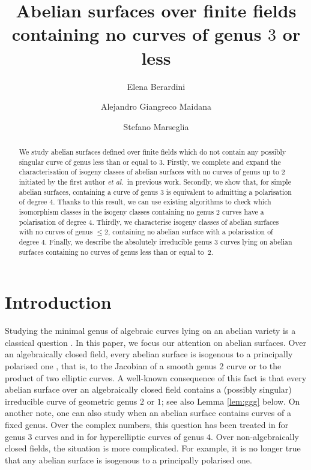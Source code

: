 \documentclass[11pt]{amsart}
\title{Abelian surfaces over finite fields containing no curves of genus $3$ or less}
\author{Elena Berardini}
\author{Alejandro Giangreco Maidana}
\author{Stefano Marseglia}
\theoremstyle{plain}
\theoremstyle{definition}
\begin{document}
\begin{abstract}
    We study abelian surfaces defined over finite fields which do not contain any possibly singular curve of genus less than or equal to $3$. 
    Firstly, we complete and expand the characterisation of isogeny classes of abelian surfaces with no curves of genus up to $2$ initiated by the first author \emph{et al.~}in previous work.
    Secondly, we show that, for simple abelian surfaces, containing a curve of genus $3$ is equivalent to admitting a polarisation of degree $4$. Thanks to this result, we can use existing algorithms to check which isomorphism classes in the isogeny classes containing no genus $2$ curves have a polarisation of degree $4$. 
    Thirdly, we characterise isogeny classes of abelian surfaces with no curves of genus $\leq 2$, containing no abelian surface with a polarisation of degree $4$. 
    Finally, we describe the absolutely irreducible genus $3$ curves lying on abelian surfaces containing  no curves of genus less than or equal to~$2$.%
\end{abstract}

\maketitle
\section*{Introduction}
Studying the minimal genus of algebraic curves lying on an abelian variety is a classical question \cite{AP90,debarre1994degrees,BCV95}. 
In this paper, we focus our attention on abelian surfaces.
Over an algebraically closed field, every abelian surface is isogenous to a principally polarised one  \cite[Cor.~1, p.~234]{M_AV70}, that is, to the Jacobian of a smooth genus 2 curve or to the product of two elliptic curves. 
A well-known consequence of this fact is that every abelian surface over an algebraically closed field contains a (possibly singular) irreducible curve of geometric genus $2$ or $1$; see also Lemma \ref{lem:ggg} below.  On another note, one can also study when an abelian surface contains curves of a fixed genus. Over the complex numbers, this question has been treated in \cite{Barth} for genus $3$ curves and in \cite{BS17} for hyperelliptic curves of genus $4$. Over non-algebraically closed fields, the situation is more complicated. For example, it is no longer true that any abelian surface is isogenous to a principally polarised one. 
\end{document}
